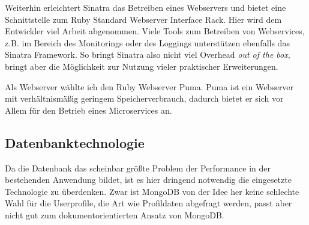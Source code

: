 Weiterhin erleichtert Sinatra das Betreiben eines Webservers und bietet eine Schnittstelle zum Ruby Standard Webserver Interface Rack\cite{rack}. Hier wird dem Entwickler viel Arbeit abgenommen. Viele Tools zum Betreiben von Webservices, z.B. im Bereich des Monitorings oder des Loggings unterstützen ebenfalls das Sinatra Framework. So bringt Sinatra also nicht viel Overhead \textit{out of the box}, bringt aber die Möglichkeit zur Nutzung vieler praktischer Erweiterungen.

Als Webserver wählte ich den Ruby Webserver Puma\cite{puma}. Puma ist ein Webserver mit verhältnismäßig geringem Speicherverbrauch, dadurch bietet er sich vor Allem für den Betrieb eines Microservices an.
\subsection{Datenbanktechnologie}
Da die Datenbank das scheinbar größte Problem der Performance in der bestehenden Anwendung bildet, ist es hier dringend notwendig die eingesetzte Technologie zu überdenken. 
Zwar ist MongoDB von der Idee her keine schlechte Wahl für die Userprofile, die Art wie Profildaten abgefragt werden, passt aber nicht gut zum dokumentorientierten Ansatz von MongoDB.

